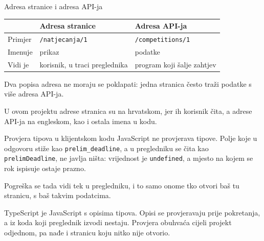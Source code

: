 \begin{frame}{Adresa stranice i adresa API-ja}
\vspace{0.3em}
\begin{center}
{\small
\setlength{\tabcolsep}{6pt}
\renewcommand{\arraystretch}{1.25}
\begin{tabular}{@{}L{2.0cm}L{4.7cm}L{4.6cm}@{}}
  \toprule
   & \textbf{Adresa stranice} & \textbf{Adresa API-ja} \\
  \midrule
  Primjer & \texttt{/natjecanja/1} & \texttt{/competitions/1} \\
  Imenuje & prikaz & podatke \\
  Vidi je & korisnik, u traci preglednika & program koji šalje zahtjev \\
  \bottomrule
\end{tabular}
}
\end{center}

\vspace{0.6em}
Dva popisa adresa ne moraju se poklapati: jedna stranica često traži podatke s više adresa API-ja.

\vspace{0.6em}
\begin{konvencija}
U ovom projektu adrese stranica su na hrvatskom, jer ih korisnik čita, a adrese API-ja na engleskom, kao i ostala imena u kodu.
\end{konvencija}
\end{frame}

\begin{frame}{Provjera tipova u klijentskom kodu}
JavaScript ne provjerava tipove. Polje koje u odgovoru stiže kao \texttt{prelim\_deadline}, a u pregledniku se čita kao \texttt{prelimDeadline}, ne javlja ništa: vrijednost je \texttt{undefined}, a mjesto na kojem se rok ispisuje ostaje prazno.

\vspace{0.9em}
Pogreška se tada vidi tek u pregledniku, i to samo onome tko otvori baš tu stranicu, s baš takvim podatcima.

\vspace{0.9em}
TypeScript je JavaScript s opisima tipova. Opisi se provjeravaju prije pokretanja, a iz koda koji preglednik izvodi nestaju. Provjera obuhvaća cijeli projekt odjednom, pa nađe i stranicu koju nitko nije otvorio.
\end{frame}

